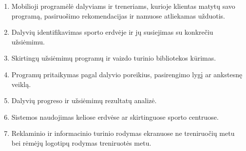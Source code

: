 \documentclass[a4paper,11pt]{article}
\begin{document}
\begin{enumerate}[label=\arabic*., start=14]
    \item Mobilioji programėlė dalyviams ir treneriams, kurioje klientas matytų savo programą, pasiruošimo rekomendacijas ir namuose atliekamas užduotis.
    \item Dalyvių identifikavimas sporto erdvėje ir jų susiejimas su konkrečiu užsiėmimu.
    \item Skirtingų užsiėmimų programų ir vaizdo turinio bibliotekos kūrimas.
    \item Programų pritaikymas pagal dalyvio poreikius, pasirengimo lygį ar ankstesnę veiklą.
    \item Dalyvių progreso ir užsiėmimų rezultatų analizė.
    \item Sistemos naudojimas keliose erdvėse ar skirtinguose sporto centruose.
    \item Reklaminio ir informacinio turinio rodymas ekranuose ne treniruočių metu bei rėmėjų logotipų rodymas treniruotės metu.
\end{enumerate}
\end{document}
